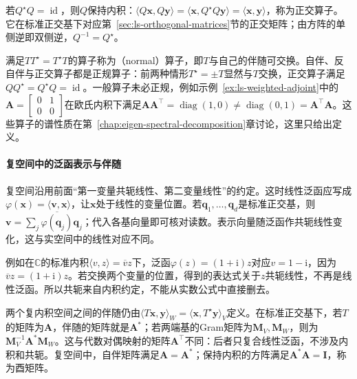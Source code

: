 若$Q^\star Q=\operatorname{id}$，则$Q$保持内积：$\langle Q\bm x,Q\bm y\rangle=\langle\bm x,Q^\star Q\bm y\rangle=\langle\bm x,\bm y\rangle$，称为正交算子。它在标准正交基下对应第~\ref{sec:ls-orthogonal-matrices}节的正交矩阵；由方阵的单侧逆即双侧逆，$Q^{-1}=Q^\star$。

满足$TT^\star=T^\star T$的算子称为（normal）算子，即$T$与自己的伴随可交换。自伴、反自伴与正交算子都是正规算子：前两种情形$T^\star=\pm T$显然与$T$交换，正交算子满足$QQ^\star=Q^\star Q=\operatorname{id}$。一般算子未必正规，例如示例~\ref{ex:ls-weighted-adjoint}中的$\bm A=\left[\begin{smallmatrix}0&1\\0&0\end{smallmatrix}\right]$在欧氏内积下满足$\bm A\bm A^\top=\operatorname{diag}(1,0)\neq\operatorname{diag}(0,1)=\bm A^\top\bm A$。这些算子的谱性质在第~\ref{chap:eigen-spectral-decomposition}章讨论，这里只给出定义。

\paragraph{复空间中的泛函表示与伴随}
复空间沿用前面“第一变量共轭线性、第二变量线性”的约定。这时线性泛函应写成$\varphi(\bm x)=\langle\bm v,\bm x\rangle$，让$\bm x$处于线性的变量位置。若$\bm q_1,\ldots,\bm q_d$是标准正交基，则$\bm v=\sum_j\overline{\varphi(\bm q_j)}\bm q_j$；代入各基向量即可核对读数。表示向量随泛函作共轭线性变化，这与实空间中的线性对应不同。

例如在$\mathbb C$的标准内积$\langle v,z\rangle=\overline v z$下，泛函$\varphi(z)=(1+\mathrm i)z$对应$v=1-\mathrm i$，因为$\overline v z=(1+\mathrm i)z$。若交换两个变量的位置，得到的表达式关于$z$共轭线性，不再是线性泛函。所以共轭来自内积约定，不能从实数公式中直接删去。

两个复内积空间之间的伴随仍由$\langle T\bm x,\bm y\rangle_W=\langle\bm x,T^\star\bm y\rangle_V$定义。在标准正交基下，若$T$的矩阵为$\bm A$，伴随的矩阵就是$\bm A^*$；若两端基的Gram矩阵为$\bm M_V,\bm M_W$，则为$\bm M_V^{-1}\bm A^*\bm M_W$。这与代数对偶映射的矩阵$\bm A^\top$不同：后者只复合线性泛函，不涉及内积和共轭。复空间中，自伴矩阵满足$\bm A=\bm A^*$；保持内积的方阵满足$\bm A^*\bm A=\bm I$，称为酉矩阵。
